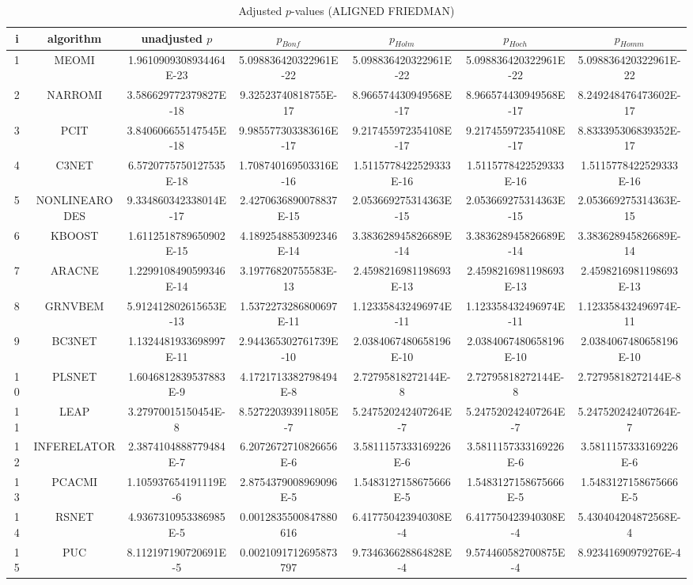 \documentclass[a4paper,10pt]{article}
\begin{document}
\begin{landscape}
\begin{table}[!htp]
\centering\scriptsize
\caption{Adjusted $p$-values (ALIGNED FRIEDMAN)}
\begin{tabular}{ccccccc}
i&algorithm&unadjusted $p$&$p_{Bonf}$&$p_{Holm}$&$p_{Hoch}$&$p_{Homm}$\\
\hline
1&MEOMI&1.9610909308934464E-23&5.098836420322961E-22&5.098836420322961E-22&5.098836420322961E-22&5.098836420322961E-22\\
2&NARROMI&3.586629772379827E-18&9.32523740818755E-17&8.966574430949568E-17&8.966574430949568E-17&8.249248476473602E-17\\
3&PCIT&3.840606655147545E-18&9.985577303383616E-17&9.217455972354108E-17&9.217455972354108E-17&8.833395306839352E-17\\
4&C3NET&6.5720775750127535E-18&1.708740169503316E-16&1.5115778422529333E-16&1.5115778422529333E-16&1.5115778422529333E-16\\
5&NONLINEARODES&9.334860342338014E-17&2.4270636890078837E-15&2.053669275314363E-15&2.053669275314363E-15&2.053669275314363E-15\\
6&KBOOST&1.6112518789650902E-15&4.1892548853092346E-14&3.383628945826689E-14&3.383628945826689E-14&3.383628945826689E-14\\
7&ARACNE&1.2299108490599346E-14&3.19776820755583E-13&2.4598216981198693E-13&2.4598216981198693E-13&2.4598216981198693E-13\\
8&GRNVBEM&5.912412802615653E-13&1.5372273286800697E-11&1.123358432496974E-11&1.123358432496974E-11&1.123358432496974E-11\\
9&BC3NET&1.1324481933698997E-11&2.944365302761739E-10&2.0384067480658196E-10&2.0384067480658196E-10&2.0384067480658196E-10\\
10&PLSNET&1.6046812839537883E-9&4.1721713382798494E-8&2.72795818272144E-8&2.72795818272144E-8&2.72795818272144E-8\\
11&LEAP&3.27970015150454E-8&8.527220393911805E-7&5.247520242407264E-7&5.247520242407264E-7&5.247520242407264E-7\\
12&INFERELATOR&2.3874104888779484E-7&6.2072672710826656E-6&3.5811157333169226E-6&3.5811157333169226E-6&3.5811157333169226E-6\\
13&PCACMI&1.105937654191119E-6&2.8754379008969096E-5&1.5483127158675666E-5&1.5483127158675666E-5&1.5483127158675666E-5\\
14&RSNET&4.9367310953386985E-5&0.0012835500847880616&6.417750423940308E-4&6.417750423940308E-4&5.430404204872568E-4\\
15&PUC&8.112197190720691E-5&0.0021091712695873797&9.734636628864828E-4&9.574460582700875E-4&8.92341690979276E-4\\

\end{tabular}
\end{table}
\end{landscape}
\end{document}
